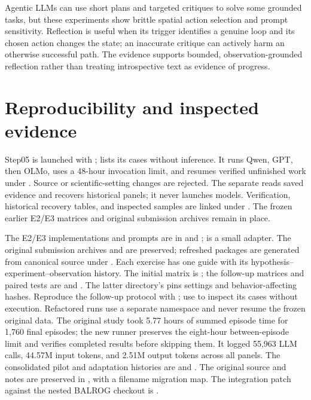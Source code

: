 \documentclass[11pt,a4paper]{article}
\begin{document}
Agentic LLMs can use short plans and targeted critiques to solve some grounded tasks, but these experiments show brittle spatial action selection and prompt sensitivity. Reflection is useful when its trigger identifies a genuine loop and its chosen action changes the state; an inaccurate critique can actively harm an otherwise successful path. The evidence supports bounded, observation-grounded reflection rather than treating introspective text as evidence of progress.

\section{Reproducibility and inspected evidence}


Step05 is launched with ;  lists its cases without inference. It runs Qwen, GPT, then OLMo, uses a 48-hour invocation limit, and resumes verified unfinished work under . Source or scientific-setting changes are rejected. The separate  reads saved evidence and recovers historical panels; it never launches models. Verification, historical recovery tables, and inspected samples are linked under . The frozen earlier E2/E3 matrices and original submission archives remain in place.

The E2/E3 implementations and prompts are in  and ;  is a small adapter. The original submission archives  and  are preserved; refreshed packages are generated from canonical source under . Each exercise has one guide with its hypothesis--experiment--observation history. The initial matrix is ; the follow-up matrices and paired tests are  and . The latter directory's  pins settings and behavior-affecting hashes. Reproduce the follow-up protocol with ; use  to inspect its cases without execution. Refactored runs use a separate  namespace and never resume the frozen original data. The original study took 5.77 hours of summed episode time for 1,760 final episodes; the new runner preserves the eight-hour between-episode limit and verifies completed results before skipping them. It logged 55,963 LLM calls, 44.57M input tokens, and 2.51M output tokens across all panels. The consolidated pilot and adaptation histories are  and . The original source and notes are preserved in , with a filename migration map. The integration patch against the nested BALROG checkout is .
\end{document}
